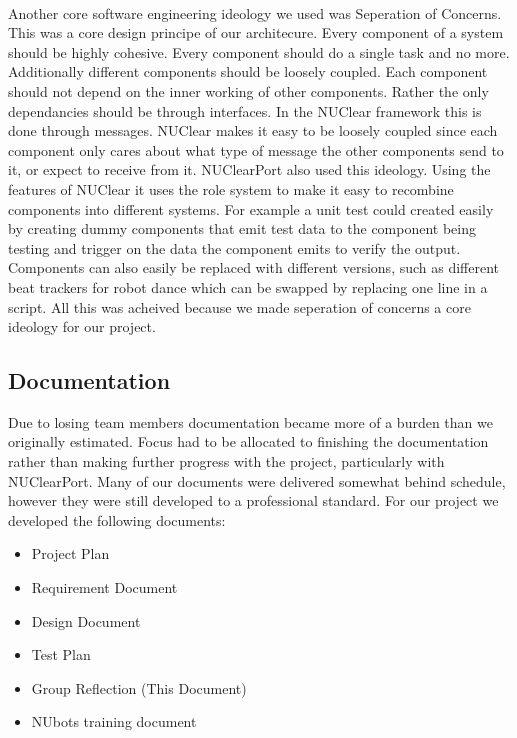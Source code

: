 \documentclass[english,12pt]{scrartcl}
\begin{document}
		\\
		Another core software engineering ideology we used was Seperation of Concerns.
		This was a core design principe of our architecure.
		Every component of a system should be highly cohesive.
		Every component should do a single task and no more.
		Additionally different components should be loosely coupled.
		Each component should not depend on the inner working of other components.
		Rather the only dependancies should be through interfaces.
		In the NUClear framework this is done through messages.
		NUClear makes it easy to be loosely coupled since each component only cares about what type of message the other components send to it, or expect to receive from it.
		NUClearPort also used this ideology.
		Using the features of NUClear it uses the role system to make it easy to recombine components into different systems.
		For example a unit test could created easily by creating dummy components that emit test data to the component being testing and trigger on the data the component emits to verify the output.
		Components can also easily be replaced with different versions, such as different beat trackers for robot dance which can be swapped by replacing one line in a script.
		All this was acheived because we made seperation of concerns a core ideology for our project.
	
		
	\subsection{Documentation}
		Due to losing team members documentation became more of a burden than we originally estimated.
		Focus had to be allocated to finishing the documentation rather than making further progress with the project, particularly with NUClearPort.
		Many of our documents were delivered somewhat behind schedule, however they were still developed to a professional standard.
		For our project we developed the following documents:
		\begin{itemize}
			\item Project Plan
			\item Requirement Document
			\item Design Document
			\item Test Plan
			\item Group Reflection (This Document)
			\item NUbots training document
		\end{itemize}
		
\end{document}
